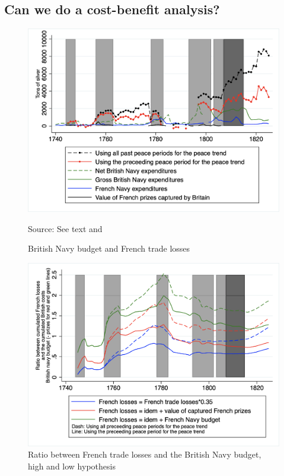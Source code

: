 \documentclass[12pt,a4paper,notitlepage,english]{article}
\newcommand{\source}[1]{\caption*{\footnotesize Source: {#1}} }
\begin{document}
\begin{appendix}
\section{Can we do a cost-benefit analysis?}
\begin{center}
	\begin{figure}[h!]
		\caption{British Navy budget and French trade losses}
		\label{Expenditures}
		\centering
		\includegraphics[scale=0.5]{Expenditures_Annual_Loss.png}
		\source{See text and \cite[pp. 570-587]{mitchell1988}}
	\end{figure}
\end{center}
\begin{center}
	\begin{figure}[h!]
		\caption{Ratio between French trade losses and the British Navy budget, high and low hypothesis}
		\label{Ratio_BR_Expenditures}
		\centering
		\includegraphics[scale=0.4]{Ratio_BR_Expenditures_Annual_LossH.png}

\end{figure}
\end{center}
\end{appendix}
\end{document}
